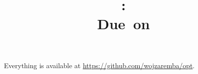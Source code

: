 \documentclass{article}
\title{
\vspace{2in}
\textmd{\textbf{\hmwkClass:\ \hmwkTitle}}\\
\normalsize\vspace{0.1in}\small{Due\ on\ \hmwkDueDate}\\
\vspace{0.1in}\large{\textit{\hmwkClassInstructor}}
\vspace{3in}
}
\author{\textbf{\hmwkAuthorName}}
\date{} %
\begin{document}
\maketitle



\newpage
\tableofcontents
\newpage



Everything is available at \url{https://github.com/wojzaremba/opt}.
\end{document}
